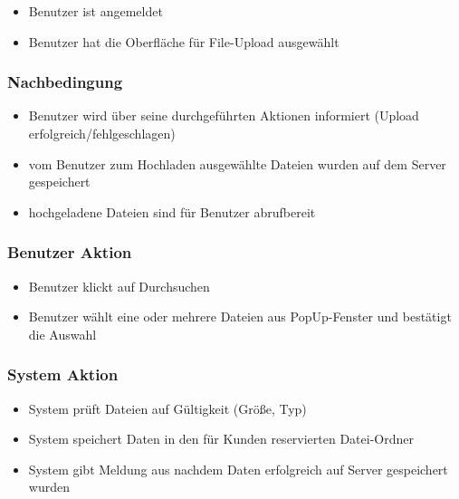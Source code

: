 \documentclass[a4paper,12pt]{article}
\begin{document}
\begin{itemize}

\item
  Benutzer ist angemeldet
\item
  Benutzer hat die Oberfläche für File-Upload ausgewählt
\end{itemize}

\subsubsection{Nachbedingung}\label{nachbedingung-11}

\begin{itemize}

\item
  Benutzer wird über seine durchgeführten Aktionen informiert (Upload
  erfolgreich/fehlgeschlagen)
\item
  vom Benutzer zum Hochladen ausgewählte Dateien wurden auf dem Server
  gespeichert
\item
  hochgeladene Dateien sind für Benutzer abrufbereit
\end{itemize}

\subsubsection{Benutzer Aktion}\label{benutzer-aktion-11}

\begin{itemize}

\item
  Benutzer klickt auf Durchsuchen
\item
  Benutzer wählt eine oder mehrere Dateien aus PopUp-Fenster und
  bestätigt die Auswahl
\end{itemize}

\subsubsection{System Aktion}\label{system-aktion-11}

\begin{itemize}

\item
  System prüft Dateien auf Gültigkeit (Größe, Typ)
\item
  System speichert Daten in den für Kunden reservierten Datei-Ordner
\item
  System gibt Meldung aus nachdem Daten erfolgreich auf Server
  gespeichert wurden
\end{itemize}
\end{document}
